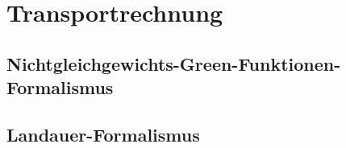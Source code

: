 \section{Transportrechnung}
\label{cha:transportrechnung}

\subsection{Nichtgleichgewichts-Green-Funktionen-Formalismus}
\label{cha:nichtgleichgewichtsgreenfunktionenformalismus}

\subsection{Landauer-Formalismus}
\label{cha:landauerformalismus}
